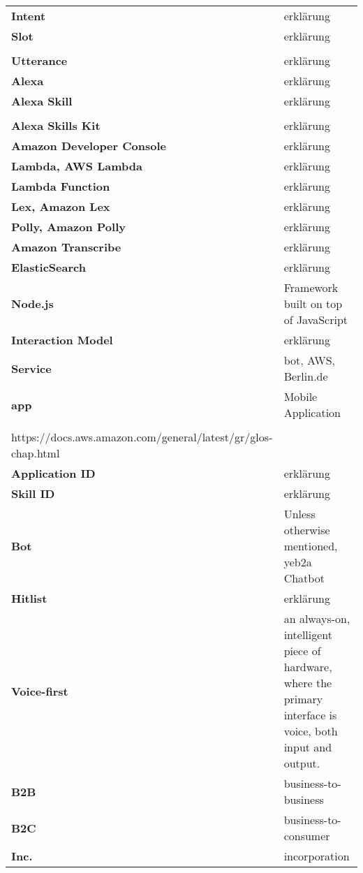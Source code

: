\begin{flushleft}
\begin{tabular}{ll}
\textbf{Intent}	&	erklärung\\
\textbf{Slot}	&	erklärung\\
\\
\textbf{Utterance}	&	erklärung\\
\textbf{Alexa}	&	erklärung\\
\textbf{Alexa Skill}	&	erklärung\\
\\

\textbf{Alexa Skills Kit}	&	erklärung\\
\textbf{Amazon Developer Console}	&	erklärung\\
\textbf{Lambda, AWS Lambda}	&	erklärung\\
\textbf{Lambda Function}	&	erklärung\\
\textbf{Lex, Amazon Lex}	&	erklärung\\
\textbf{Polly, Amazon Polly}	&	erklärung\\
\textbf{Amazon Transcribe}	&	erklärung\\
\textbf{ElasticSearch}	&	erklärung\\
\textbf{Node.js}	&	Framework built on top of JavaScript\\
\textbf{Interaction Model}	&	erklärung\\
\textbf{Service}	&	bot, AWS, Berlin.de\\
\textbf{app}	&	Mobile Application\\
\\
https://docs.aws.amazon.com/general/latest/gr/glos-chap.html
\\
\textbf{Application ID}	&	erklärung\\
\textbf{Skill ID}	&	erklärung\\
\textbf{Bot}	&	Unless otherwise mentioned, yeb2a Chatbot\\
\textbf{Hitlist}	&	erklärung\\
\textbf{Voice-first}	& an always-on, intelligent piece of hardware, where the primary interface is voice, both input and output.\\
\textbf{B2B}	&	business-to-business\\
\textbf{B2C}	&	business-to-consumer\\
\textbf{Inc.}	&	incorporation\\


\end{tabular}
\end{flushleft}
